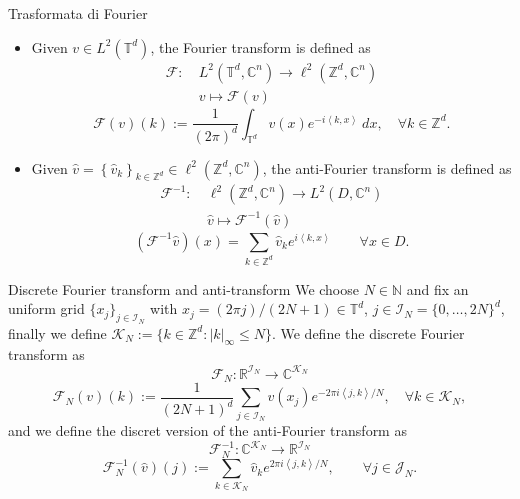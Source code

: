 \documentclass{beamer}
\newcommand{\numberset}{\mathbb}
\newcommand{\N}{\numberset{N}}
\newcommand{\Z}{\numberset{Z}}
\newcommand{\R}{\numberset{R}}
\newcommand{\C}{\numberset{C}}
\begin{document}

\begin{frame}[noframenumbering]{Trasformata di Fourier}
	\centering
	\begin{itemize}
		\item  Given $ v \in  L^2(\mathbb{T}^d) $, the Fourier transform is defined as 
		\[ \begin{split}
			\mathcal{F} : \ & L^{2}(\mathbb{T}^d, \C^{n})\to \ell^{2}(\Z^d, \C^{n})\\
			& v \mapsto \mathcal{F}(v)
		\end{split} \]
		\[ \mathcal{F}(v)(k) := \frac{1}{(2 \pi)^{d}} \int_{\mathbb{T}^{d}}v(x) e^{-i \left\langle k , x \right\rangle} \ dx,  \quad \forall k \in \Z^d. \]
		\item Given $ \widehat{v} = \left\lbrace \widehat{v}_k\right\rbrace_{k \in \Z^d} \in \ell^{2}(\Z^d, \C^{n}) $, the anti-Fourier transform is defined as 
		\[ \begin{split}
			\mathcal{F}^{-1} : \ & \ell^{2}(\Z^d, \C^{n}) \to L^{2}(D, \C^{n})\\
			& \widehat{v} \mapsto \mathcal{F}^{-1}(\widehat{v})
		\end{split} \]
		\[ (\mathcal{F}^{-1}\widehat{v})(x) = \sum_{k \in \Z^d} \widehat{v}_k e^{i \left\langle k , x \right\rangle } \qquad \forall x \in D. \]
	\end{itemize}
\end{frame}


\begin{frame}[noframenumbering]{Discrete Fourier transform and anti-transform}
	We choose $ N \in \N $ and fix an uniform grid $ \{x_j\}_{j \in \mathcal{I}_N} $ with $ x_j = (2\pi j)/(2N+1) \in \mathbb{T}^d $, $ j \in \mathcal{I}_N = \{0, \dots, 2N\}^{d} $, finally we define $\mathcal{K}_N := \{k \in \Z^d : |k|_{\infty} \le N\}$.
	We define the discrete Fourier transform as
	\[ \mathcal{F}_{N}: \R^{\mathcal{I}_N} \to \C^{\mathcal{K}_N}\]\[ \mathcal{F}_{N}(v)(k) := \frac{1}{(2N+1)^{d}} \sum_{j \in \mathcal{I}_N}v(x_j) e^{-2\pi i \left\langle j, k \right\rangle/N }, \quad \forall k \in \mathcal{K}_N, \]
	and we define the discret version of the anti-Fourier transform as
	\[ \mathcal{F}_{N}^{-1}: \C^{\mathcal{K}_N} \to \R^{\mathcal{I}_N}\]\[ \mathcal{F}_{N}^{-1}(\widehat{v})(j) := \sum_{k \in \mathcal{K}_N} \widehat{v}_k e^{2\pi i \left\langle j, k \right\rangle/N }, \qquad \forall j \in \mathcal{J}_N. \]
\end{frame}
\end{document}
